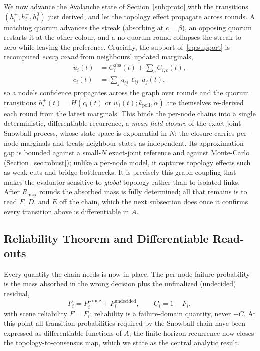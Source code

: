 \documentclass[journal]{IEEEtran}
\newcommand{\kpoll}{\ensuremath{k_{\mathrm{poll}}}}      %
\begin{document}
We now advance the Avalanche state of Section~\ref{sub:proto} with the transitions
$(h^+_i,h^-_i,h^0_i)$ just derived, and let the topology effect propagate across
rounds. A matching quorum advances the streak (absorbing at $c{=}\beta$), an
opposing quorum restarts it at the other colour, and a no-quorum round collapses
the streak to zero while leaving the preference. Crucially, the support
of~\eqref{eq:support} is recomputed \emph{every round} from neighbours' updated
marginals,
\begin{equation}
  \begin{aligned}
  u_i(t)&=C^{\mathrm{abs}}_i(t)+\!\sum_{c}C_{i,c}(t),\\
  c_i(t)&=\sum_{j} q_{ij}\,\ell_{ij}\,u_j(t),
  \end{aligned}
  \label{eq:recurrence}
\end{equation}
so a node's confidence propagates across the graph over rounds and the quorum
transitions $h^\pm_i(t)=H(c_i(t)\text{ or }\bar w_i(t);\kpoll,\alpha)$ are
themselves re-derived each round from the latest marginals. This binds the
per-node chains into a single deterministic, differentiable recurrence, a
\emph{mean-field closure} of the exact joint Snowball process, whose state space
is exponential in $N$: the closure carries per-node marginals and treats
neighbour states as independent. Its approximation gap is bounded against a
small-$N$ exact-joint reference and against Monte-Carlo
(Section~\ref{sec:robust}); unlike a per-node model, it captures topology effects
such as weak cuts and bridge bottlenecks. It is precisely this graph coupling
that makes the evaluator sensitive to \emph{global} topology rather than to
isolated links. After $R_{\max}$ rounds the absorbed mass is fully determined; all
that remains is to read $F$, $D$, and $E$ off the chain, which the next subsection
does once it confirms every transition above is differentiable in $A$.

\subsection{Reliability Theorem and Differentiable Read-outs}\label{sub:theorem}

Every quantity the chain needs is now in place. The per-node failure probability
is the mass absorbed in the wrong decision plus the unfinalized (undecided)
residual,
\begin{equation}
  F_i=P^{\mathrm{wrong}}_i+P^{\mathrm{undecided}}_i,\qquad C_i=1-F_i,
  \label{eq:failure}
\end{equation}
with scene reliability $F=\overline{F_i}$; reliability is a failure-domain
quantity, never $-C$. At this point all transition probabilities required by the
Snowball chain have been expressed as differentiable functions of $A$; the
finite-horizon recurrence now closes the topology-to-consensus map, which we
state as the central analytic result.
\end{document}
